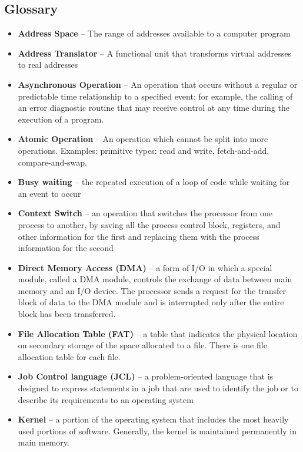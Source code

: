\documentclass[fontsize=5pt]{scrartcl}
\begin{document}
\begin{multicols}{3}
  \section{Glossary}
    \begin{itemize}
      \item \textbf{Address Space} – The range of addresses available to a computer program
      \item \textbf{Address Translator} – A functional unit that transforms virtual addresses to real addresses
      \item \textbf{Asynchronous Operation} – An operation that occurs without a regular or predictable time relationship to a specified event; 
                              for example, the calling of an error diagnostic routine that may receive control at any time during the execution of a program.
      \item \textbf{Atomic Operation} – An operation which cannot be split into more operations. Examples: primitive types: read and write, fetch-and-add, compare-and-swap. 
      \item \textbf{Busy waiting} – the repeated execution of a loop of code while waiting for an event to occur
      \item \textbf{Context Switch} – an operation that switches the processor from one process to another, by saving all the process control block, registers, and other information for the first and 
                                      replacing them with the process information for the second
      \item \textbf{Direct Memory Access (DMA)} – a form of I/O in which a special module, called a DMA module, controls the exchange of data between main memory and an I/O device.  
                                  The processor sends a request for the transfer block of data to the DMA module and is interrupted only after the entire block has been transferred.
      \item \textbf{File Allocation Table (FAT)} – a table that indicates the physical location on secondary storage of the space allocated to a file.  There is one file allocation table for each file.
      \item \textbf{Job Control language (JCL)} – a problem-oriented language that is designed to express statements in a job that are used to identify the job or to describe its requirements to an operating system
      \item \textbf{Kernel} – a portion of the operating system that includes the most heavily used portions of software.  Generally, the kernel is maintained permanently in main memory.  

\end{itemize}
\end{multicols}
\end{document}
